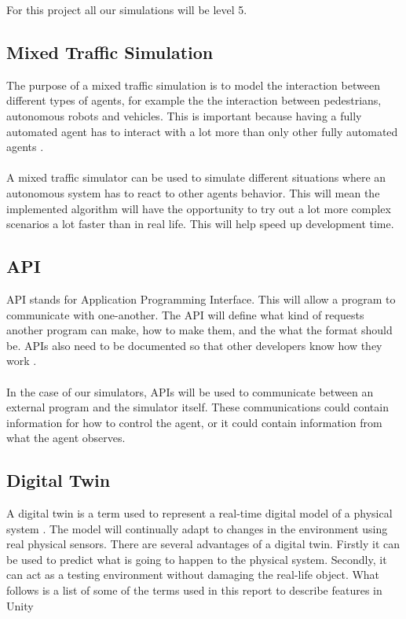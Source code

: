 For this project all our simulations will be level 5. 

\subsection{Mixed Traffic Simulation}
The purpose of a mixed traffic simulation is to model the interaction between different types of agents, for example the the interaction between pedestrians, autonomous robots and vehicles. This is important because having a fully automated agent has to interact with a lot more than only other fully automated agents \cite{KernerBorisS2021Eoad}. 
\\~\\
A mixed traffic simulator can be used to simulate different situations where an autonomous system has to react to other agents behavior. This will mean the implemented algorithm will have the opportunity to try out a lot more complex scenarios a lot faster than in real life. This will help speed up development time. 


\subsection{API}
API stands for Application Programming Interface. This will allow a program to communicate with one-another. The API will define what kind of requests another program can make, how to make them, and the what the format should be. APIs also need to be documented so that other developers know how they work \cite{WulfJochen2020FVCw}.
\\~\\
In the case of our simulators, APIs will be used to communicate between an external program and the simulator itself. These communications could contain information for how to control the agent, or it could contain information from what the agent observes. 

\subsection{Digital Twin}
A digital twin is a term used to represent a real-time digital model of a physical system \cite{alma991000321338701591}. The model will continually adapt to changes in the environment using real physical sensors. There are several advantages of a digital twin. Firstly it can be used to predict what is going to happen to the physical system. Secondly, it can act as a testing environment without damaging the real-life object. What follows is a list of some of the terms used in this report to describe features in Unity

